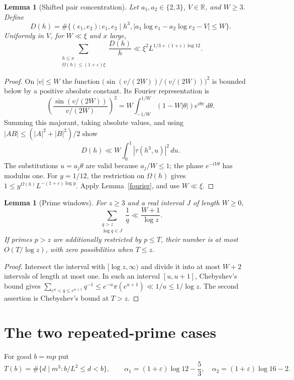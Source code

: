 \documentclass[11pt,a4paper]{article}
\newtheorem{lemma}[theorem]{Lemma}
\newcommand{\Om}{\Omega}
\newcommand{\dd}{\,d}
\begin{document}
\begin{lemma}[Shifted pair concentration]\label{pairs}
Let $a_1,a_2\in\{2,3\}$, $V\in\mathbb R$, and $W\ge3$.
Define
\[
 D(h)=\#\{(e_1,e_2):e_1,e_2\mid h^3,
       |a_1\log e_1-a_2\log e_2-V|\le W\}.
\]
Uniformly in $V$, for $W\ll\xi$ and $x$ large,
\[
 \sum_{\substack{h\le x\\\Om(h)\le(1+\varepsilon)\xi}}
       \frac{D(h)}h
 \ll \xi^2 L^{1/3+(1+\varepsilon)\log12}.
\]
\end{lemma}
\begin{proof}
On $|v|\le W$ the function
$\big(\sin(v/(2W))/(v/(2W))\big)^2$ is bounded below by a positive
absolute constant. Its Fourier representation is
\[
 \left(\frac{\sin(v/(2W))}{v/(2W)}\right)^2
 =W\int_{-1/W}^{1/W}(1-W|\theta|)e^{i\theta v}\dd\theta.
\]
Summing this majorant, taking absolute values, and using
$|AB|\le(|A|^2+|B|^2)/2$ show
\[
 D(h)\ll W\int_0^1|\tau(h^3,u)|^2\dd u.
\]
The substitutions $u=a_j\theta$ are valid because $a_j/W\le1$;
the phase $e^{-iV\theta}$ has modulus one.
For $y=1/12$, the restriction on $\Om(h)$ gives
$1\le y^{\Om(h)}L^{-(1+\varepsilon)\log y}$.
Apply Lemma~\ref{fourier}, and use $W\ll\xi$.
\end{proof}

\begin{lemma}[Prime windows]\label{primewindows}
For $z\ge3$ and a real interval $J$ of length $W\ge0$,
\[
 \sum_{\substack{q>z\\\log q\in J}}\frac1q
 \ll\frac{W+1}{\log z}.
\]
If primes $p>z$ are additionally restricted by $p\le T$, their number
is at most $O(T/\log z)$, with zero possibilities when $T\le z$.
\end{lemma}
\begin{proof}
Intersect the interval with $[\log z,\infty)$ and divide it into
at most $W+2$ intervals of length at most one. In such an interval
$[u,u+1]$, Chebyshev's bound gives
$\sum_{e^u<q\le e^{u+1}}q^{-1}\le e^{-u}\pi(e^{u+1})
\ll1/u\le1/\log z$.
The second assertion is Chebyshev's bound at $T>z$.
\end{proof}

\section{The two repeated-prime cases}
For good $b=mp$ put
\[
 T(b)=\#\{d\mid m^3:b/L^2\le d<b\},\qquad
 \alpha_1=(1+\varepsilon)\log12-\frac53,\quad
 \alpha_2=(1+\varepsilon)\log16-2.
\]
\end{document}
